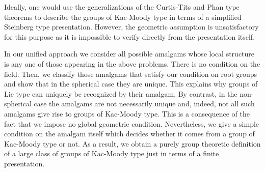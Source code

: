 \documentclass[12pt]{amsart}
\theoremstyle{definition}
\begin{document}
Ideally, one would use the generalizations of the Curtis-Tits and Phan type theorems to describe the groups of Kac-Moody type in terms of a simplified Steinberg type presentation. 
However, the geometric assumption is unsatisfactory for this purpose as it is impossible to verify directly from the presentation itself. 

In our unified approach we consider all possible amalgams whose local structure is any one of those appearing in the above problems. There is no condition on the field.
Then, we classify those amalgams that satisfy our condition on root groups and show that in the spherical case they are unique. This explains why groups of Lie type can uniquely be recognized by their amalgam.
By contrast, in the non-spherical case the amalgams are not necessarily unique and, indeed, not all such amalgams give rise to groups of Kac-Moody type. This is a consequence of the fact that we impose no global geometric condition.
Nevertheless, we give a simple condition on the amalgam itself which decides whether it comes from a group of Kac-Moody type or not. As a result, we obtain a purely group theoretic definition of a large class of groups of Kac-Moody type just in terms of a finite presentation.
\end{document}
